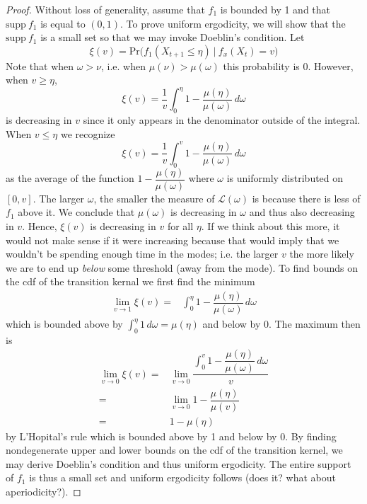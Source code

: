 \documentclass[11pt, a4paper]{article}
\theoremstyle{plain}
\theoremstyle{definition}
\newcommand{\pr}{\mathrm{Pr}}
\begin{document}
\begin{proof}
Without loss of generality, assume that $f_1$ is bounded by 1 and that 
$\mbox{supp}~f_1$ is equal to $(0, 1)$. To prove uniform ergodicity, 
we will show that the $\mbox{supp}~f_1$ is a small set so that we may invoke
Doeblin's condition.
Let $$\xi(v) = \pr\bigg(f_1(X_{t+1} \le \eta)~|~f_x(X_t) = v\bigg)$$
Note that when $\omega > \nu$, i.e. when $\mu(\nu) > \mu(\omega)$ this probability is 0.
However, when $v \ge \eta$,
$$\xi(v) = \dfrac{1}{v}\int_0^\eta
1 -\dfrac{\mu(\eta)}{\mu(\omega)}\,d\omega$$
is decreasing in $v$ since it only appears in the denominator outside of the integral.
When $v \le \eta$ we recognize $$\xi(v) = \dfrac{1}{v}\int_0^v
1 -\dfrac{\mu(\eta)}{\mu(\omega)}\,d\omega$$ as the average of the
function $1 -\dfrac{\mu(\eta)}{\mu(\omega)}$
where $\omega$ is uniformly distributed on $[0, v]$. The larger $\omega$,
the smaller the measure of $\mathcal{L}(\omega)$ is because there is less of 
$f_1$ above it. We conclude that $\mu(\omega)$ is decreasing in $\omega$ and thus also decreasing in $v$. 
Hence, $\xi(v)$ is decreasing in $v$ for all $\eta$. If we think about this more,
it would not make sense if it were increasing because that would imply that
we wouldn't be spending enough time in the modes; i.e. the larger $v$ 
the more likely we are to end up \emph{below} some threshold (away from the mode).
To find bounds on the cdf of the transition kernal we first find the minimum
\begin{align*}
\lim_{v \to 1}\xi(v) ={}&\int_0^\eta 1 - \dfrac{\mu(\eta)}{\mu(\omega)}\,d\omega
\end{align*}
which is bounded above by $\int_0^\eta 1 \,d\omega = \mu(\eta)$ and below by $0$. 
The maximum then is
\begin{align*}
\lim_{v \to 0}\xi(v) ={}&\lim_{v \to 0}\dfrac{\int_0^v 1 - \dfrac{\mu(\eta)}{\mu(\omega)}\,d\omega}{v}\\
={}& \lim_{v \to 0} 1 - \dfrac{\mu(\eta)}{\mu(v)}\\
={}& 1 - \mu(\eta)
\end{align*}
by L'Hopital's rule which is bounded above by 1 and below by 0. By finding
nondegenerate upper and lower bounds on the cdf of the transition kernel, we may
derive Doeblin's condition and thus uniform ergodicity. The entire support
of $f_1$ is thus a small set and uniform ergodicity follows (does it? what about aperiodicity?).
\end{proof}
\end{document}
